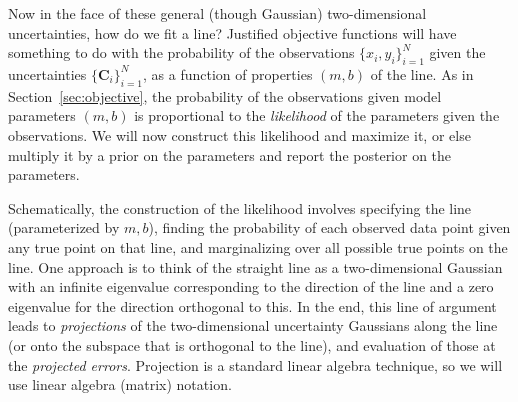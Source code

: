 \documentclass[12pt,twoside]{article}
\newcommand{\sectionname}{Section}
\newcommand{\mmatrix}[1]{\boldsymbol{#1}}
\newcommand{\mC}{\mmatrix{C}}
\newcommand{\setofall}[3]{\{{#1}\}_{{#2}}^{{#3}}}
\newcommand{\allxy}{\setofall{x_i,y_i}{i=1}{N}}
\newcommand{\allC}{\setofall{\mC_i}{i=1}{N}}
\begin{document}
Now in the face of these general (though Gaussian) two-dimensional
uncertainties, how do we fit a line?  Justified objective functions
will have something to do with the probability of the observations
$\allxy$ given the uncertainties $\allC$, as a function of properties
$(m,b)$ of the line.  As in \sectionname~\ref{sec:objective}, the
probability of the observations given model parameters $(m,b)$ is
proportional to the \emph{likelihood} of the parameters given the
observations.  We will now construct this likelihood and maximize it,
or else multiply it by a prior on the parameters and report the
posterior on the parameters.

Schematically, the construction of the likelihood involves specifying
the line (parameterized by $m,b$), finding the probability of each
observed data point given any true point on that line, and
marginalizing over all possible true points on the line.  One approach
is to think of the straight line as a two-dimensional Gaussian with an
infinite eigenvalue corresponding to the direction of the line and a
zero eigenvalue for the direction orthogonal to this. In the end, this
line of argument leads to \emph{projections} of the two-dimensional
uncertainty Gaussians along the line (or onto the subspace that is
orthogonal to the line), and evaluation of those at the
\emph{projected errors}.  Projection is a standard linear algebra
technique, so we will use linear algebra (matrix) notation.
\end{document}
